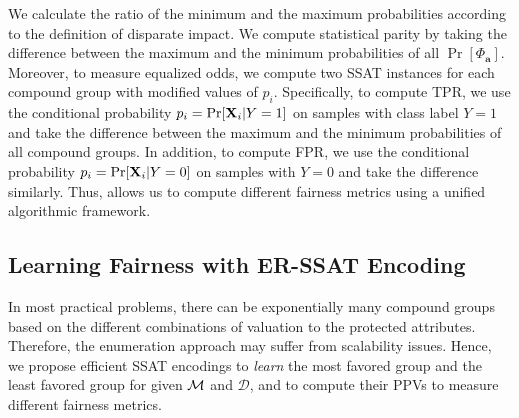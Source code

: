 We calculate the ratio of the minimum and the maximum probabilities according to the definition of disparate impact. 
We compute statistical parity by taking the difference between the maximum and the minimum probabilities of all $ \Pr[\Phi_{\mathbf{a}}] $.
Moreover, to measure equalized odds, we compute two SSAT instances for each compound group with modified values of $ p_i $. 
Specifically, to compute TPR, we use the conditional probability $ p_i = \Pr[\mathbf{X}_i|Y=1] $ on samples with class label $ Y = 1 $ and take the difference between the maximum and the minimum probabilities of all compound groups. In addition, to compute FPR, we use the conditional probability $ p_i = \Pr[\mathbf{X}_i|Y=0] $ on samples with $ Y = 0 $ and take the difference similarly.
Thus, {\justiciaenum} allows us to compute different fairness metrics using a unified algorithmic framework.


\subsection{Learning Fairness with ER-SSAT Encoding}
\label{fairness_justicia_sec:learn_ssat}
In most practical problems, there can be exponentially many compound groups based on the different combinations of valuation to the protected attributes. 
Therefore, the enumeration approach may suffer from scalability issues. 
Hence, we propose efficient SSAT encodings to \textit{learn} the most favored group and the least favored group for given  $\mathcal{M}$ and $ \mathcal{D} $, and to compute their PPVs to measure different fairness metrics. 

